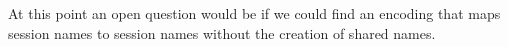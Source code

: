 \begin{comment}
\begin{proof}[Sketch]
For completeness, we 
consider the \HO process $P = {\bbout{k}{\abs{x} Q} P_1} \Par \binp{k}{X} P_2$. We have that
\[
P \red P_1 \Par P_2 \subst{\abs{x}Q}{X}
\]
In the target language, this reduction is mimicked as follows:
\begin{eqnarray*}
\pmap{P}{2} & = & \newsp{a}{\bout{k}{a} (\pmap{P_1}{3} \Par \repl{} \binp{a}{y} \binp{y}{x} \pmap{Q}{3})\,} 
                  \Par \binp{k}{x} \pmap{P_2}{3} \\
            & \red & \newsp{a}{\pmap{P_1}{3} \Par \repl{} \binp{a}{y} \binp{y}{x} \pmap{Q}{3} 
                  \Par  \pmap{P_2}{3}\subst{a}{x}}
\end{eqnarray*}
\qed
\end{proof}
\end{comment}


At this point an open  question would be if we could find an encoding that maps
session names to session names without the creation of shared names.


